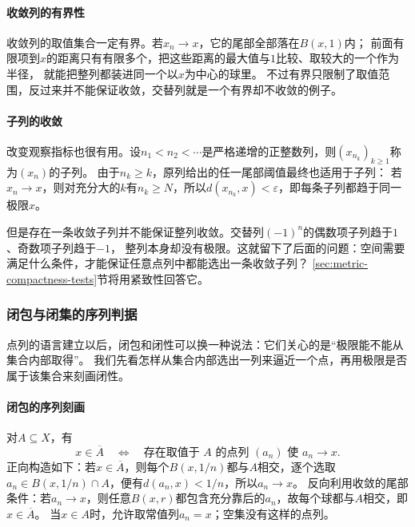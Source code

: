 \paragraph{收敛列的有界性}

收敛列的取值集合一定有界。若$x_n\to x$，它的尾部全部落在$B(x,1)$内；
前面有限项到$x$的距离只有有限多个，把这些距离的最大值与$1$比较、取较大的一个作为半径，
就能把整列都装进同一个以$x$为中心的球里。
不过有界只限制了取值范围，反过来并不能保证收敛，交替列就是一个有界却不收敛的例子。

\paragraph{子列的收敛}

改变观察指标也很有用。设$n_1<n_2<\cdots$是严格递增的正整数列，则$(x_{n_k})_{k\geq1}$称为$(x_n)$的子列。
由于$n_k\geq k$，原列给出的任一尾部阈值最终也适用于子列：
若$x_n\to x$，则对充分大的$k$有$n_k\geq N$，所以$d(x_{n_k},x)<\varepsilon$，即每条子列都趋于同一极限$x$。

但是存在一条收敛子列并不能保证整列收敛。交替列$(-1)^n$的偶数项子列趋于$1$、奇数项子列趋于$-1$，
整列本身却没有极限。这就留下了后面的问题：空间需要满足什么条件，才能保证任意点列中都能选出一条收敛子列？
\ref{sec:metric-compactness-tests}节将用紧致性回答它。

\subsubsection{闭包与闭集的序列判据}
\label{sec:metric-sequential-closedness}

点列的语言建立以后，闭包和闭性可以换一种说法：它们关心的是“极限能不能从集合内部取得”。
我们先看怎样从集合内部选出一列来逼近一个点，再用极限是否属于该集合来刻画闭性。

\paragraph{闭包的序列刻画}

对$A\subseteq X$，有
\begin{equation}
\label{eq:metric-sequential-closure}
  x\in\overline A
  \quad\Longleftrightarrow\quad
  \text{存在取值于 }A\text{ 的点列 }(a_n)\text{ 使 }a_n\to x.
\end{equation}
正向构造如下：若$x\in\overline A$，则每个$B(x,1/n)$都与$A$相交，逐个选取$a_n\in B(x,1/n)\cap A$，便有$d(a_n,x)<1/n$，所以$a_n\to x$。
反向利用收敛的尾部条件：若$a_n\to x$，则任意$B(x,r)$都包含充分靠后的$a_n$，故每个球都与$A$相交，即$x\in\overline A$。
当$x\in A$时，允许取常值列$a_n=x$；空集没有这样的点列。

